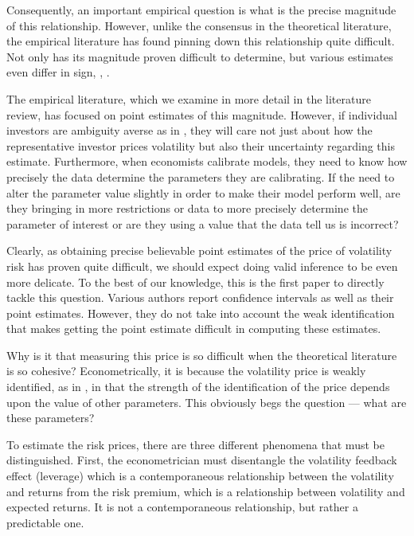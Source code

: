 \documentclass[11pt, letterpaper, twoside, final]{article}
\begin{document}
Consequently, an important empirical question is what is the precise magnitude of this relationship.
However, unlike the consensus in the theoretical literature, the empirical literature has found pinning down this
relationship quite difficult.
Not only has its magnitude proven difficult to determine, but various estimates even differ in sign,
\parencite{lettau2010measuring}, .

The empirical literature, which we examine in more detail in the literature review, has focused on point estimates
of this magnitude. 
However, if individual investors are ambiguity averse as in \textcite{hansen2001robust, jiu2012ambiguity}, they
will care not just about how the representative investor prices volatility but also their uncertainty regarding
this estimate. 
Furthermore, when economists calibrate models, they need to know how precisely the data determine the parameters
they are calibrating.
If the need to alter the parameter value slightly in order to make their model perform well, are they bringing in
more restrictions or data to more precisely determine the parameter of interest or are they using a value that the
data tell us is incorrect?

Clearly, as obtaining precise believable point estimates of the price of volatility risk has proven quite
difficult, we should expect doing valid inference to be even more delicate.
To the best of our knowledge, this is the first paper to directly tackle this question.
Various authors report confidence intervals as well as their point estimates.
However, they do not take into account the weak identification that makes getting the point estimate difficult in
computing these estimates.

Why is it that measuring this price is so difficult when the theoretical literature is so cohesive?
Econometrically, it is because the volatility price is weakly identified, as in \textcite{andrews2012estimation},
in that the strength of the identification of the price depends upon the value of other parameters. 
This obviously begs the question --- what are these parameters? 

To estimate the risk prices, there are three different phenomena that must be distinguished.
First, the econometrician must disentangle the volatility feedback effect (leverage) which is a contemporaneous
relationship between the volatility and returns from the risk premium, which is a relationship between volatility
and expected returns. 
It is not a contemporaneous relationship, but rather a predictable one. 
\end{document}
